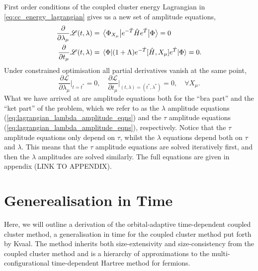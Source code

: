 First order conditions of the coupled cluster energy Lagrangian in
\autoref{eq:cc_energy_lagrangian} gives us a new set of amplitude equations,
\begin{align}
    \label{eq:lagrangian_tau_amplitude_eqns}
    \frac{\partial}{\partial \lambda_\mu} \mathscr{L}(t, \lambda)
    &= \mel{\Phi_{X_\mu}}{e^{-\hat{T}}\hat{H}e^{\hat{T}} }{\Phi} = 0 \\
    \label{eq:lagrangian_lambda_amplitude_eqns} 
    \frac{\partial}{\partial t_\mu} \mathscr{L}(t, \lambda)
    &= \mel{\Phi}{(1 + \Lambda)e^{-\hat{T}}[\hat{H}, X_\mu]e^{\hat{T}} }{\Phi} = 0.
\end{align}
Under constrained optimisation all partial derivatives vanish at the same point,
\begin{equation}
    \frac{\partial \mathscr{L}}{\partial \lambda_\mu}\Big\lvert_{t=t^*} = 0,
    \quad
    \frac{\partial \mathscr{L}}{\partial t_\mu}\Big\lvert_{(t,\lambda)=(t^*,\lambda^*)} = 0,
    \quad \forall X_\mu.
\end{equation}
What we have arrived at are amplitude equations both for the ``bra part'' and the 
``ket part'' of the problem, which we refer to as the $\lambda$ amplitude equations
(\autoref{eq:lagrangian_lambda_amplitude_eqns}) and 
the $\tau$ amplitude equations
(\autoref{eq:lagrangian_lambda_amplitude_eqns}), respectively. Notice that the $\tau$ amplitude equations 
only depend on $\tau$, whilst the $\lambda$ equations depend both on $\tau$ and $\lambda$.
This means that the $\tau$ amplitude equations are solved iteratively first, and then 
the $\lambda$ amplitudes are solved similarly.
The full equations are given in appendix (LINK TO APPENDIX).

\section{Generealisation in Time}

Here, we will outline a derivation of the orbital-adaptive time-dependent coupled cluster 
method, a generalisation in time for the coupled cluster method put forth by 
Kvaal\cite{kvaal2012ab}. The method inherits both size-extensivity and size-consistency from 
the coupled cluster method and is a hierarchy of approximations to the multi-configurational 
time-dependent Hartree method for fermions.

